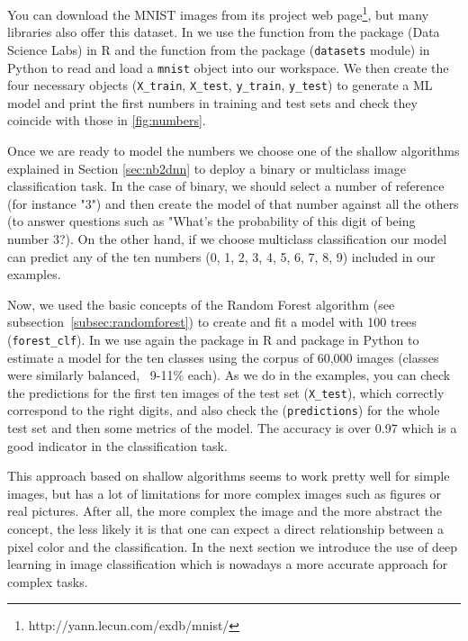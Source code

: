 You can download the MNIST images from its project web page\footnote{http://yann.lecun.com/exdb/mnist/}, but many libraries also offer this dataset. In  we use the  function from the  package (Data Science Labs) in R and the  function from the  package (\texttt{datasets} module) in Python to read and load a \texttt{mnist} object into our workspace. We then create the four necessary objects (\texttt{X\_train}, \texttt{X\_test}, \texttt{y\_train}, \texttt{y\_test}) to generate a ML model and print the first numbers in training and test sets and check they coincide with those in \ref{fig:numbers}.


Once we are ready to model the numbers we choose one of the shallow algorithms explained in Section \ref{sec:nb2dnn} to deploy a binary or multiclass image classification task. In the case of binary, we should select a number of reference (for instance "3") and then create the model of that number against all the others (to answer questions such as "What's the probability of this digit of being number 3?). On the other hand, if we choose multiclass classification our model can predict any of the ten numbers (0, 1, 2, 3, 4, 5, 6, 7, 8, 9) included in our examples.

Now, we used the basic concepts of the Random Forest algorithm (see subsection~\ref{subsec:randomforest}) to create and fit a model with 100 trees (\texttt{forest\_clf}). In  we use again the  package in R and  package in Python to estimate a model for the ten classes using the corpus of 60,000 images (classes were similarly balanced, ~9-11\% each). As we do in the examples, you can check the predictions for the first ten images of the test set (\texttt{X\_test}), which correctly correspond to the right digits, and also check the (\texttt{predictions}) for the whole test set and then some metrics of the model. The accuracy is over 0.97 which is a good indicator in the classification task.


This approach based on shallow algorithms seems to work pretty well for simple images, but has a lot of limitations for more complex images such as figures or real pictures. After all, the more complex the image and the more abstract the concept, the less likely it is that one can expect a direct relationship between a pixel color and the classification. In the next section we introduce the use of deep learning in image classification which is nowadays a more accurate approach for complex tasks.


